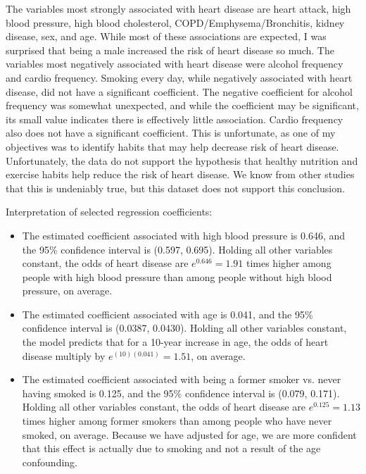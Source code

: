 \documentclass[12pt]{article}
\begin{document}
The variables most strongly associated with heart disease are heart attack, high blood pressure, high blood cholesterol, COPD/Emphysema/Bronchitis, kidney disease, sex, and age. While most of these associations are expected, I was surprised that being a male increased the risk of heart disease so much. The variables most negatively associated with heart disease were alcohol frequency and cardio frequency. Smoking every day, while negatively associated with heart disease, did not have a significant coefficient. The negative coefficient for alcohol frequency was somewhat unexpected, and while the coefficient may be significant, its small value indicates there is effectively little association. Cardio frequency also does not have a significant coefficient. This is unfortunate, as one of my objectives was to identify habits that may help decrease risk of heart disease. Unfortunately, the data do not support the hypothesis that healthy nutrition and exercise habits help reduce the risk of heart disease. We know from other studies that this is undeniably true, but this dataset does not support this conclusion.


\bigskip \noindent Interpretation of selected regression coefficients:

\begin{itemize}
  \item The estimated coefficient associated with high blood pressure is 0.646, and the 95\% confidence interval is (0.597, 0.695). Holding all other variables constant, the odds of heart disease are $e^{0.646} = 1.91$ times higher among people with high blood pressure than among people without high blood pressure, on average.
  \item The estimated coefficient associated with age is 0.041, and the 95\% confidence interval is (0.0387, 0.0430). Holding all other variables constant, the model predicts that for a 10-year increase in age, the odds of heart disease multiply by $e^{(10)(0.041)} = 1.51$, on average.
  \item The estimated coefficient associated with being a former smoker vs. never having smoked is 0.125, and the 95\% confidence interval is (0.079,  0.171). Holding all other variables constant, the odds of heart disease are $e^{0.125} = 1.13$ times higher among former smokers than among people who have never smoked, on average. Because we have adjusted for age, we are more confident that this effect is actually due to smoking and not a result of the age confounding.
\end{itemize}
\end{document}
